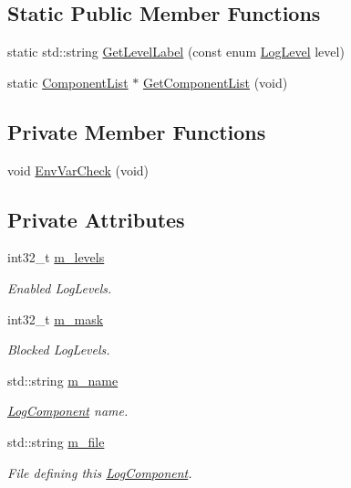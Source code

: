 \subsection*{Static Public Member Functions}
\begin{DoxyCompactItemize}
\item 
static std\+::string \hyperlink{classns3_1_1LogComponent_a613a94661d6f91de7cece069867322ce}{Get\+Level\+Label} (const enum \hyperlink{namespacens3_aa6464a4d69551a9cc968e17a65f39bdb}{Log\+Level} level)
\item 
static \hyperlink{classns3_1_1LogComponent_ab33052bb0294bc3014a31bcc17032199}{Component\+List} $\ast$ \hyperlink{classns3_1_1LogComponent_a63eb2c0fd93c30f9081443c2fd4bffe9}{Get\+Component\+List} (void)
\end{DoxyCompactItemize}
\subsection*{Private Member Functions}
\begin{DoxyCompactItemize}
\item 
void \hyperlink{classns3_1_1LogComponent_ad0d2eecba6290bf1ee398c7b1a1f5702}{Env\+Var\+Check} (void)
\end{DoxyCompactItemize}
\subsection*{Private Attributes}
\begin{DoxyCompactItemize}
\item 
int32\+\_\+t \hyperlink{classns3_1_1LogComponent_a5d615e327e15f2a57457844ca70313b1}{m\+\_\+levels}
\begin{DoxyCompactList}\small\item\em Enabled Log\+Levels. \end{DoxyCompactList}\item 
int32\+\_\+t \hyperlink{classns3_1_1LogComponent_acc996a608820204f9c01c01cc3157484}{m\+\_\+mask}
\begin{DoxyCompactList}\small\item\em Blocked Log\+Levels. \end{DoxyCompactList}\item 
std\+::string \hyperlink{classns3_1_1LogComponent_af7fcce0f3820136c19e478622baf0db6}{m\+\_\+name}
\begin{DoxyCompactList}\small\item\em \hyperlink{classns3_1_1LogComponent}{Log\+Component} name. \end{DoxyCompactList}\item 
std\+::string \hyperlink{classns3_1_1LogComponent_a893d49bd993ad4e3555c9fa464a1105a}{m\+\_\+file}
\begin{DoxyCompactList}\small\item\em File defining this \hyperlink{classns3_1_1LogComponent}{Log\+Component}. \end{DoxyCompactList}\end{DoxyCompactItemize}


